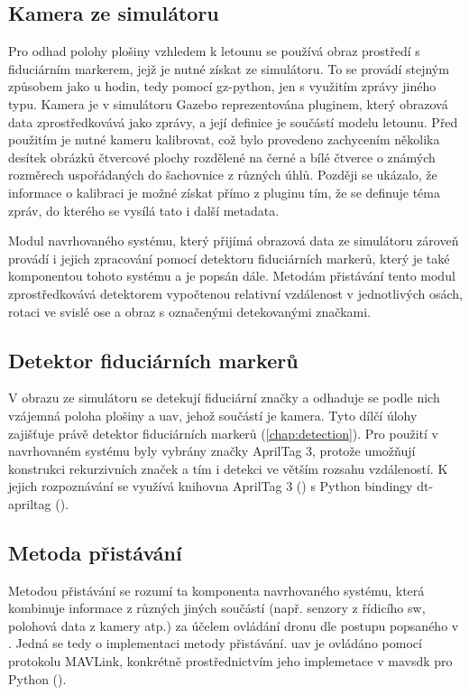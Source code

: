     \subsection{Kamera ze simulátoru}
      Pro odhad polohy plošiny vzhledem k letounu se používá obraz prostředí s fiduciárním markerem, jejž je nutné získat ze simulátoru. To se provádí stejným způsobem jako u hodin, tedy pomocí gz-python, jen s využitím zprávy jiného typu. Kamera je v simulátoru Gazebo reprezentována pluginem, který obrazová data zprostředkovává jako zprávy, a její definice je součástí modelu letounu. Před použitím je nutné kameru kalibrovat, což bylo provedeno zachycením několika desítek obrázků čtvercové plochy rozdělené na černé a bílé čtverce o známých rozměrech uspořádaných do šachovnice z různých úhlů. Později se ukázalo, že informace o kalibraci je možné získat přímo z pluginu tím, že se definuje téma zpráv, do kterého se vysílá tato i další metadata.

      Modul navrhovaného systému, který přijímá obrazová data ze simulátoru zároveň provádí i jejich zpracování pomocí detektoru fiduciárních markerů, který je také komponentou tohoto systému a je popsán dále. Metodám přistávání tento modul zprostředkovává detektorem vypočtenou relativní vzdálenost v jednotlivých osách, rotaci ve svislé ose a obraz s označenými detekovanými značkami.
    \subsection{Detektor fiduciárních markerů}
      V obrazu ze simulátoru se detekují fiduciární značky a odhaduje se podle nich vzájemná poloha plošiny a \acrshort{uav}, jehož součástí je kamera. Tyto dílčí úlohy zajišťuje právě detektor fiduciárních markerů (\cref{chap:detection}). Pro použití v navrhovaném systému byly vybrány značky AprilTag 3, protože umožňují konstrukci rekurzivních značek a tím i detekci ve větším rozsahu vzdáleností. K jejich rozpoznávání se využívá knihovna AprilTag 3 (\cite{apriltag3}) s Python bindingy dt-apriltag (\cite{dt-apriltags}).
    \subsection{Metoda přistávání}
      Metodou přistávání se rozumí ta komponenta navrhovaného systému, která kombinuje informace z různých jiných součástí (např. senzory z řídicího \acrshort{sw}, polohová data z kamery atp.) za účelem ovládání dronu dle postupu popsaného v . Jedná se tedy o implementaci metody přistávání. \Acrshort{uav} je ovládáno pomocí protokolu MAVLink, konkrétně prostřednictvím jeho implemetace v mavsdk pro Python (\cite{mavsdk}).
